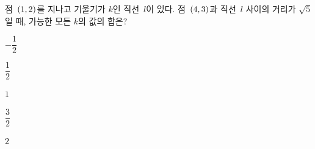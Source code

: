 점~$(1{,}\mkern3mu 2)$를 지나고 기울기가 $k$인 직선~$l$이 있다. 점~$(4{,}\mkern3mu 3)$과 직선~$l$ 사이의 거리가 $\sqrt5$일 때, 가능한 모든 $k$의 값의 합은?
\begin{choices32}{\rule[-3ex]{0pt}{8ex}$-\dfrac12$}{\rule[-3ex]{0pt}{8ex}$\dfrac12$}{\rule[-3ex]{0pt}{8ex}$1$}{\rule[-3ex]{0pt}{8ex}$\dfrac32$}{\rule[-3ex]{0pt}{8ex}$2$}\end{choices32}
